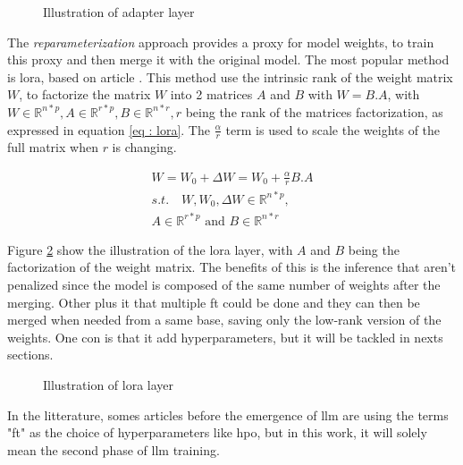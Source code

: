 \begin{figure}[h]
    \centering
    
    \caption{Illustration of adapter layer}
    \label{fig:adapter}
\end{figure}

The \textit{reparameterization} approach provides a proxy for model weights, to train this proxy and then merge it with the original model. The most popular method is \acrfull{lora}, based on article \cite{hu_lora_2021}. This method use the intrinsic rank of the weight matrix $W$, to factorize the matrix $W$ into 2 matrices $A$ and $B$ with $W = B.A$, with $W \in \mathbb{R}^{n*p}, A \in \mathbb{R}^{r*p} , B \in \mathbb{R}^{n*r}, r$ being the rank of the matrices factorization, as expressed in equation \ref{eq : lora}. The $\frac{\alpha}{r}$ term is used to scale the weights of the full matrix when $r$ is changing. 

\begin{equation}
    \begin{split}
    W = W_0 + \Delta W = W_0 + \frac{\alpha}{r} B.A \\
    s.t. \quad W,W_0,\Delta W \in \mathbb{R}^{n*p},\\
    A \in \mathbb{R}^{r*p} \text{ and } B \in \mathbb{R}^{n*r}
    \end{split}
    \label{eq : lora}
\end{equation}

Figure \ref{fig:lora} show the illustration of the \gls{lora} layer, with $A$ and $B$ being the factorization of the weight matrix. The benefits of this is the inference that aren't penalized since the model is composed of the same number of weights after the merging. Other plus it that multiple \gls{ft} could be done and they can then be merged when needed from a same base, saving only the low-rank version of the weights. One con is that it add \glspl{hyperparameter}, but it will be tackled in nexts sections.

\begin{figure}[h]
    \centering
    
    \caption{Illustration of lora layer}
    \label{fig:lora}
\end{figure}

In the litterature, somes articles before the emergence of \acrshort{llm} are using the terms "\gls{ft}" as the choice of \glspl{hyperparameter} like \acrfull{hpo}, but in this work, it will solely mean the second phase of \acrshort{llm} training.

